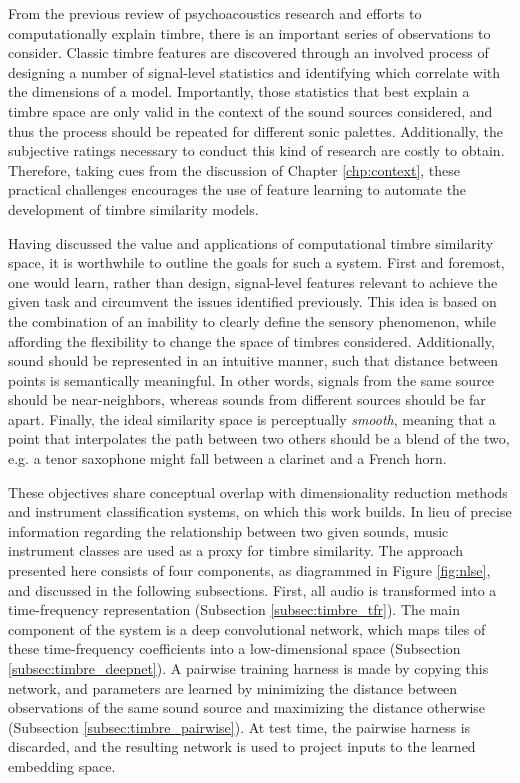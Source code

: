 From the previous review of psychoacoustics research and efforts to computationally explain timbre, there is an important series of observations to consider.
Classic timbre features are discovered through an involved process of designing a number of signal-level statistics and identifying which correlate with the dimensions of a model.
Importantly, those statistics that best explain a timbre space are only valid in the context of the sound sources considered, and thus the process should be repeated for different sonic palettes.
Additionally, the subjective ratings necessary to conduct this kind of research are costly to obtain.
Therefore, taking cues from the discussion of Chapter \ref{chp:context}, these practical challenges encourages the use of feature learning to automate the development of timbre similarity models.

Having discussed the value and applications of computational timbre similarity space, it is worthwhile to outline the goals for such a system.
First and foremost, one would learn, rather than design, signal-level features relevant to achieve the given task and circumvent the issues identified previously.
This idea is based on the combination of an inability to clearly define the sensory phenomenon, while affording the flexibility to change the space of timbres considered.
Additionally, sound should be represented in an intuitive manner, such that distance between points is semantically meaningful.
In other words, signals from the same source should be near-neighbors, whereas sounds from different sources should be far apart.
Finally, the ideal similarity space is perceptually \emph{smooth}, meaning that a point that interpolates the path between two others should be a blend of the two, e.g. a tenor saxophone might fall between a clarinet and a French horn.

These objectives share conceptual overlap with dimensionality reduction methods and instrument classification systems, on which this work builds.
In lieu of precise information regarding the relationship between two given sounds, music instrument classes are used as a proxy for timbre similarity.
The approach presented here consists of four components, as diagrammed in Figure \ref{fig:nlse}, and discussed in the following subsections.
First, all audio is transformed into a time-frequency representation (Subsection \ref{subsec:timbre_tfr}).
The main component of the system is a deep convolutional network, which maps tiles of these time-frequency coefficients into a low-dimensional space (Subsection \ref{subsec:timbre_deepnet}).
A pairwise training harness is made by copying this network, and parameters are learned by minimizing the distance between observations of the same sound source and maximizing the distance otherwise (Subsection \ref{subsec:timbre_pairwise}).
At test time, the pairwise harness is discarded, and the resulting network is used to project inputs to the learned embedding space.


